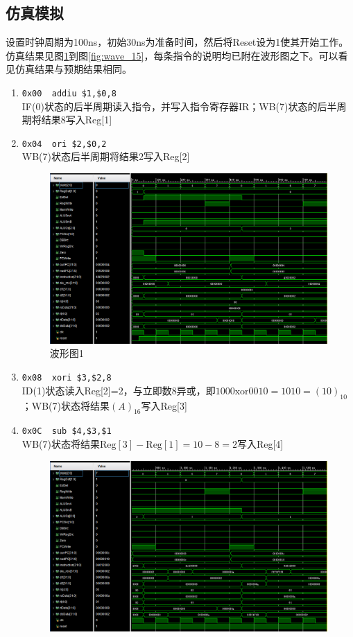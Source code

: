 
\subsection{仿真模拟}
\qquad 设置时钟周期为100ns，初始30ns为准备时间，然后将Reset设为1使其开始工作。仿真结果见图\ref{fig:wave_1}到图\ref{fig:wave_15}，每条指令的说明均已附在波形图之下。可以看见仿真结果与预期结果相同。
\begin{enumerate}
    \item \verb'0x00  addiu $1,$0,8'\\
    IF(0)状态的后半周期读入指令，并写入指令寄存器IR；WB(7)状态的后半周期将结果8写入Reg[1]
    \item \verb'0x04  ori $2,$0,2'\\
    WB(7)状态后半周期将结果2写入Reg[2]
\begin{figure}[H]
\centering
\includegraphics[width=0.9\linewidth]{fig/FullIns/Ins1.PNG}
\caption{波形图1}
\label{fig:wave_1}
\end{figure}
    \item \verb'0x08  xori $3,$2,8'\\
    ID(1)状态读入Reg[2]=2，与立即数8异或，即$1000 \mathrm{xor} 0010 = 1010 = (10)_{10}$；WB(7)状态将结果$(A)_{16}$写入Reg[3]
    \item \verb'0x0C  sub $4,$3,$1'\\
    WB(7)状态将结果$\mathrm{Reg}[3]-\mathrm{Reg}[1]=10-8=2$写入Reg[4]
\begin{figure}[H]
\centering
\includegraphics[width=0.9\linewidth]{fig/FullIns/Ins2.PNG}

\end{figure}
\end{enumerate}
